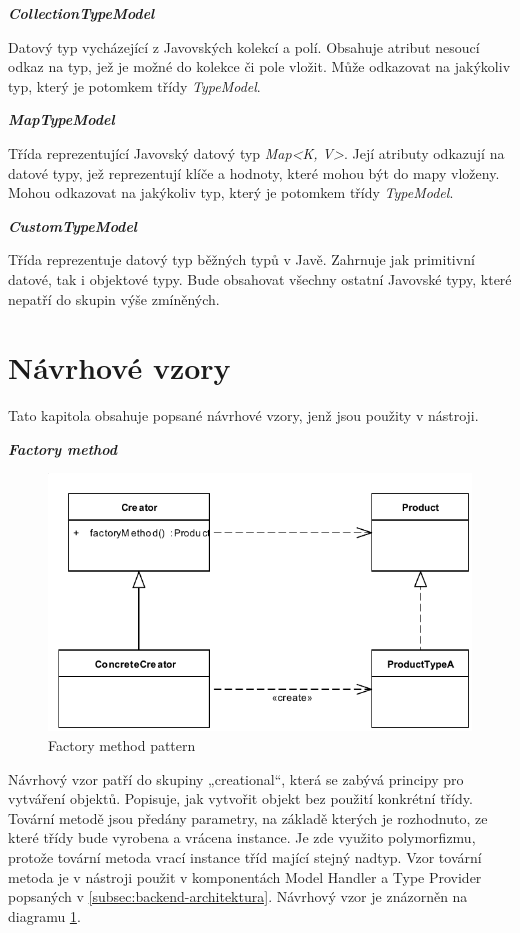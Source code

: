 \documentclass[11pt,twoside,a4paper]{book}
\begin{document}
\textbf{\textit{CollectionTypeModel}}

Datový typ vycházející z Javovských kolekcí a polí. Obsahuje atribut nesoucí odkaz na typ,
jež je možné do kolekce či pole vložit. Může odkazovat na jakýkoliv typ, který je potomkem
třídy {\em TypeModel}.

\textbf{\textit{MapTypeModel}}

Třída reprezentující Javovský datový typ {\em Map<K, V>}. Její atributy odkazují
na datové typy, jež reprezentují klíče a hodnoty, které mohou být do mapy
vloženy. Mohou odkazovat na jakýkoliv typ, který je potomkem třídy {\em
TypeModel}.

\textbf{\textit{CustomTypeModel}}

Třída reprezentuje datový typ běžných typů v Javě. Zahrnuje jak primitivní datové, tak i
objektové typy. Bude obsahovat všechny ostatní Javovské typy, které nepatří do skupin výše
zmíněných.

\section{Návrhové vzory}

Tato kapitola obsahuje popsané návrhové vzory, jenž jsou použity v nástroji.

\textbf{\textit{Factory method}}

\begin{figure}[h]
\begin{center}
\includegraphics[width=13cm]{images-pdf/FactoryMethodDesignPattern.pdf}
\caption{Factory method pattern}
\label{fig:factory-pattern}
\end{center}
\end{figure}

Návrhový vzor patří do skupiny „creational“, která se zabývá principy pro 
vytváření objektů. Popisuje, jak vytvořit objekt bez použití konkrétní třídy. 
Tovární metodě jsou předány parametry, na základě kterých je rozhodnuto, ze 
které třídy bude vyrobena a vrácena instance. Je zde využito polymorfizmu, 
protože tovární metoda vrací instance tříd mající stejný nadtyp. Vzor tovární 
metoda je v nástroji použit v komponentách Model Handler a Type Provider 
popsaných v \ref{subsec:backend-architektura}. Návrhový vzor je znázorněn na
diagramu \ref{fig:factory-pattern}.
\end{document}
